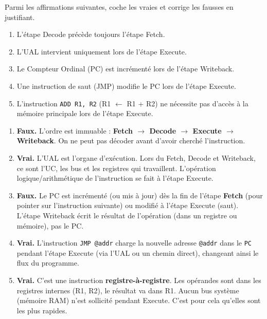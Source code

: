 \documentclass[11pt]{article}
\begin{document}
\begin{exercice}
Parmi les affirmations suivantes, coche les vraies et corrige les fausses en justifiant.
\begin{enumerate}
    \item L'étape Decode précède toujours l'étape Fetch.
    \item L'UAL intervient uniquement lors de l'étape Execute.
    \item Le Compteur Ordinal (PC) est incrémenté lors de l'étape Writeback.
    \item Une instruction de saut (JMP) modifie le PC lors de l'étape Execute.
    \item L'instruction \texttt{ADD R1, R2} (R1 $\leftarrow$ R1 + R2) ne nécessite pas d'accès à la mémoire principale lors de l'étape Execute.
\end{enumerate}
\end{exercice}

\begin{corrige}[Exercice n°2]
\begin{enumerate}
    \item \textbf{Faux.} L'ordre est immuable : \textbf{Fetch $\to$ Decode $\to$ Execute $\to$ Writeback}. On ne peut pas décoder avant d'avoir cherché l'instruction.
    \item \textbf{Vrai.} L'UAL est l'organe d'exécution. Lors du Fetch, Decode et Writeback, ce sont l'UC, les bus et les registres qui travaillent. L'opération logique/arithmétique de l'instruction se fait à l'étape Execute.
    \item \textbf{Faux.} Le PC est incrémenté (ou mis à jour) dès la fin de l'étape \textbf{Fetch} (pour pointer sur l'instruction suivante) ou modifié à l'étape Execute (saut). L'étape Writeback écrit le résultat de l'opération (dans un registre ou mémoire), pas le PC.
    \item \textbf{Vrai.} L'instruction \texttt{JMP @addr} charge la nouvelle adresse \texttt{@addr} dans le \texttt{PC} pendant l'étape Execute (via l'UAL ou un chemin direct), changeant ainsi le flux du programme.
    \item \textbf{Vrai.} C'est une instruction \textbf{registre-à-registre}. Les opérandes sont dans les registres internes (R1, R2), le résultat va dans R1. Aucun bus système (mémoire RAM) n'est sollicité pendant Execute. C'est pour cela qu'elles sont les plus rapides.
\end{enumerate}
\end{corrige}
\end{document}
